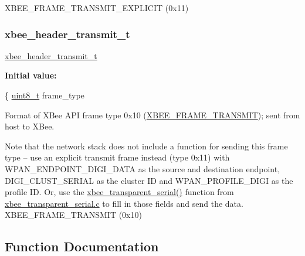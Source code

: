X\+B\+E\+E\+\_\+\+F\+R\+A\+M\+E\+\_\+\+T\+R\+A\+N\+S\+M\+I\+T\+\_\+\+E\+X\+P\+L\+I\+C\+IT (0x11) \mbox{\label{group__xbee__wpan_ga02e02911588cbafc0befb9b9da8961e6}} 
\subsubsection{\texorpdfstring{xbee\+\_\+header\+\_\+transmit\+\_\+t}{xbee\_header\_transmit\_t}}
{\footnotesize\ttfamily \hyperlink{group__xbee__wpan_ga02e02911588cbafc0befb9b9da8961e6}{xbee\+\_\+header\+\_\+transmit\+\_\+t}}

{\bfseries Initial value\+:}
\begin{DoxyCode}
\{
   \hyperlink{group__hal__dos_gae1affc9ca37cfb624959c866a73f83c2}{uint8\_t}       frame\_type
\end{DoxyCode}


Format of X\+Bee A\+PI frame type 0x10 (\hyperlink{group__xbee__device_gga7753bbebaf00d6d64942f64b6ae9b7b9a5215c258e8db6c292b9e52ca26011ed1}{X\+B\+E\+E\+\_\+\+F\+R\+A\+M\+E\+\_\+\+T\+R\+A\+N\+S\+M\+IT}); sent from host to X\+Bee. 

Note that the network stack does not include a function for sending this frame type -- use an explicit transmit frame instead (type 0x11) with W\+P\+A\+N\+\_\+\+E\+N\+D\+P\+O\+I\+N\+T\+\_\+\+D\+I\+G\+I\+\_\+\+D\+A\+TA as the source and destination endpoint, D\+I\+G\+I\+\_\+\+C\+L\+U\+S\+T\+\_\+\+S\+E\+R\+I\+AL as the cluster ID and W\+P\+A\+N\+\_\+\+P\+R\+O\+F\+I\+L\+E\+\_\+\+D\+I\+GI as the profile ID. Or, use the \hyperlink{group__xbee__transparent_gafbf9e5ccdb17be373012bd690a76e570}{xbee\+\_\+transparent\+\_\+serial()} function from \hyperlink{xbee__transparent__serial_8c}{xbee\+\_\+transparent\+\_\+serial.\+c} to fill in those fields and send the data. X\+B\+E\+E\+\_\+\+F\+R\+A\+M\+E\+\_\+\+T\+R\+A\+N\+S\+M\+IT (0x10) 

\subsection{Function Documentation}
\mbox{\label{group__xbee__wpan_ga1e5f537223d8dffb4d74f48bbc43d149}} 
